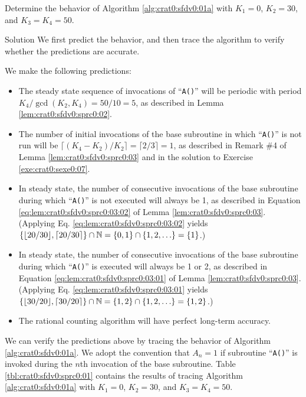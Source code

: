 \begin{vworkexamplestatement}
\label{ex:crat0:sfdv0:sprc0:01}
Determine the behavior of Algorithm \ref{alg:crat0:sfdv0:01a} with
$K_1=0$, $K_2=30$, and $K_3=K_4=50$.
\end{vworkexamplestatement}
\begin{vworkexampleparsection}{Solution}
We first predict the behavior, and then trace the algorithm to
verify whether the predictions are accurate.

We make the following predictions:

\begin{itemize}
\item The steady state sequence of invocations of ``\texttt{A()}'' will
      be periodic with period 
      $K_4/\gcd(K_2, K_4) = 50/10 = 5$, as described
      in Lemma \ref{lem:crat0:sfdv0:sprc0:02}.
\item The number of initial invocations of the 
      base subroutine in which ``\texttt{A()}''
      is not run will be 
      $\lceil (K_4 - K_2) / K_2 \rceil = \lceil 2/3 \rceil = 1$,
      as described in Remark \#4 of
      Lemma \ref{lem:crat0:sfdv0:sprc0:03} and in the solution to
      Exercise \ref{exe:crat0:sexe0:07}.
\item In steady state, the number of consecutive invocations of the 
      base subroutine during which ``\texttt{A()}''
      is not executed will always be 1, as
      described in Equation \ref{eq:lem:crat0:sfdv0:sprc0:03:02} of
      Lemma \ref{lem:crat0:sfdv0:sprc0:03}.  
      (Applying Eq. \ref{eq:lem:crat0:sfdv0:sprc0:03:02}
      yields \
      $\{ \lfloor 20/30 \rfloor , \lceil 20/30 \rceil \} \cap \vworkintsetpos %
      = \{ 0,1 \} \cap \{1, 2, \ldots \} = \{ 1 \}$.)
\item In steady state, the number of consecutive invocations of the 
      base subroutine during which ``\texttt{A()}''
      is executed will always be 1 or 2, as
      described in Equation \ref{eq:lem:crat0:sfdv0:sprc0:03:01} of
      Lemma \ref{lem:crat0:sfdv0:sprc0:03}.
      (Applying Eq. \ref{eq:lem:crat0:sfdv0:sprc0:03:01}
      yields \
      $\{ \lfloor 30/20 \rfloor , \lceil 30/20 \rceil \} \cap \vworkintsetpos %
      = \{ 1,2 \} \cap \{1, 2, \ldots \} = \{ 1,2 \}$.)
\item The rational counting algorithm will have
      perfect long-term accuracy.
\end{itemize}

We can verify the predictions above by tracing the behavior of
Algorithm \ref{alg:crat0:sfdv0:01a}.  We adopt the convention
that $A_n = 1$ if subroutine ``\texttt{A()}'' is invoked during
the $n$th invocation of the base subroutine.
Table \ref{tbl:crat0:sfdv0:sprc0:01}
contains the results of tracing Algorithm \ref{alg:crat0:sfdv0:01a}
with $K_1=0$, $K_2=30$, and $K_3=K_4=50$.


\end{vworkexampleparsection}
